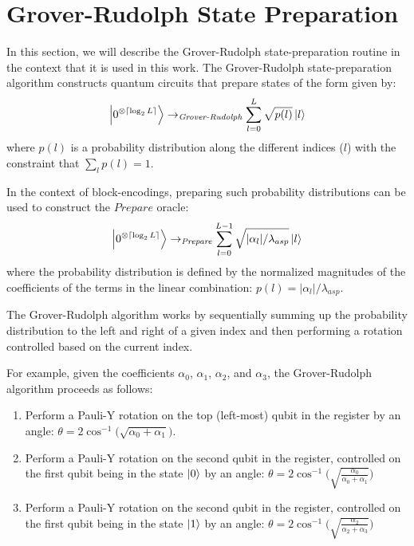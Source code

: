 \section{Grover-Rudolph State Preparation}
\label{sec:grover-rudolph}

In this section, we will describe the Grover-Rudolph state-preparation routine \cite{grover2002creating} in the context that it is used in this work.
The Grover-Rudolph state-preparation algorithm constructs quantum circuits that prepare states of the form given by:
\begin{equation}
    \ket{0^{\otimes \lceil \log_2{L} \rceil}} \rightarrow_{\textit{Grover-Rudolph}} \sum_{l=0}^L \sqrt{p(l)} \ket{l}
\end{equation}
where $p(l)$ is a probability distribution along the different indices ($l$) with the constraint that $\sum_l p(l) = 1$.

In the context of block-encodings, preparing such probability distributions can be used to construct the $Prepare$ oracle:
\begin{equation}
    \ket{0^{\otimes \lceil \log_2{L} \rceil}} \rightarrow_{\textit{Prepare}} \sum_{l = 0}^{L-1} \sqrt{|\alpha_l| / \lambda_{asp}} \ket{l}
\end{equation}
where the probability distribution is defined by the normalized magnitudes of the coefficients of the terms in the linear combination: $p(l) = |\alpha_l| / \lambda_{asp}$.

The Grover-Rudolph algorithm works by sequentially summing up the probability distribution to the left and right of a given index and then performing a rotation controlled based on the current index.

For example, given the coefficients $\alpha_0$, $\alpha_1$, $\alpha_2$, and $\alpha_3$, the Grover-Rudolph algorithm proceeds as follows:
\begin{enumerate}
    \item Perform a Pauli-Y rotation on the top (left-most) qubit in the register by an angle: $\theta = 2 \cos^{-1}\big( \sqrt{\alpha_0 + \alpha_1} \big)$.
    \item Perform a Pauli-Y rotation on the second qubit in the register, controlled on the first qubit being in the state $\ket{0}$ by an angle: $\theta = 2 \cos^{-1}\big( \sqrt{\frac{\alpha_0}{\alpha_0 + \alpha_1}} \big)$
    \item Perform a Pauli-Y rotation on the second qubit in the register, controlled on the first qubit being in the state $\ket{1}$ by an angle: $\theta = 2 \cos^{-1}\big( \sqrt{\frac{\alpha_2}{\alpha_2 + \alpha_3}} \big)$
\end{enumerate}


